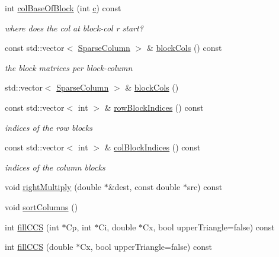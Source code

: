 \begin{DoxyCompactItemize}
int \hyperlink{classg2o_1_1SparseBlockMatrixCCS_a3a2820367f643881ebd0a45f2cd0c9be}{col\+Base\+Of\+Block} (int \hyperlink{sparse__helper_8cpp_a4e1e0e72dd773439e333c84dd762a9c3}{c}) const 
\begin{DoxyCompactList}\small\item\em where does the col at block-\/col r start? \end{DoxyCompactList}\item 
const std\+::vector$<$ \hyperlink{classg2o_1_1SparseBlockMatrixCCS_a4fc5dfe0a9ff9bd62065ca4b17f25bc1}{Sparse\+Column} $>$ \& \hyperlink{classg2o_1_1SparseBlockMatrixCCS_ae43c6599984015bdc3d481266e1555ea}{block\+Cols} () const 
\begin{DoxyCompactList}\small\item\em the block matrices per block-\/column \end{DoxyCompactList}\item 
std\+::vector$<$ \hyperlink{classg2o_1_1SparseBlockMatrixCCS_a4fc5dfe0a9ff9bd62065ca4b17f25bc1}{Sparse\+Column} $>$ \& \hyperlink{classg2o_1_1SparseBlockMatrixCCS_a5a9ef3cd8399a335edec8b7e934192b8}{block\+Cols} ()
\item 
const std\+::vector$<$ int $>$ \& \hyperlink{classg2o_1_1SparseBlockMatrixCCS_ad64c68168586e5088e767ca74ca8ba46}{row\+Block\+Indices} () const 
\begin{DoxyCompactList}\small\item\em indices of the row blocks \end{DoxyCompactList}\item 
const std\+::vector$<$ int $>$ \& \hyperlink{classg2o_1_1SparseBlockMatrixCCS_af36057337dbc4376e44f74baaf18992a}{col\+Block\+Indices} () const 
\begin{DoxyCompactList}\small\item\em indices of the column blocks \end{DoxyCompactList}\item 
void \hyperlink{classg2o_1_1SparseBlockMatrixCCS_a6d9393fa3950a7cefc7f9ca58ccede64}{right\+Multiply} (double $\ast$\&dest, const double $\ast$src) const 
\item 
void \hyperlink{classg2o_1_1SparseBlockMatrixCCS_a6500e67cc29b3fe51bc40930d97d0ac5}{sort\+Columns} ()
\item 
int \hyperlink{classg2o_1_1SparseBlockMatrixCCS_a6dfde3d314a5334c850ab825df8de77a}{fill\+C\+CS} (int $\ast$Cp, int $\ast$Ci, double $\ast$Cx, bool upper\+Triangle=false) const 
\item 
int \hyperlink{classg2o_1_1SparseBlockMatrixCCS_adab44f6a330393be5f593659a5e7c7bd}{fill\+C\+CS} (double $\ast$Cx, bool upper\+Triangle=false) const 
\end{DoxyCompactItemize}
